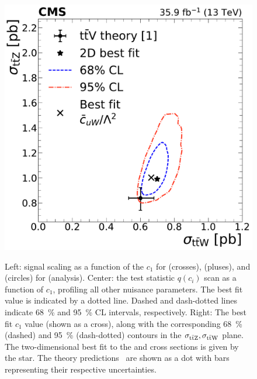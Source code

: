 \begin{landscape}
\begin{figure}
{        \includegraphics[height=\textheight]{figures/thirteen-TeV/NP/2D/ttZ_ttW_2D_1D_cuW}
      }
    \setlength{\capwidth}{14cm}
    \caption[Profile likelihood, $\mu(c_1)$, and best fit $c_1$ for \cuW (\thirteenTeV)]{Left: signal scaling as a function of the $c_1$ for \ttW (crosses), \ttZ (pluses), and \ttH (circles) for \cuW (\thirteenTeV analysis). Center: the test statistic $q(c_i)$ scan as a function of $c_1$, profiling all other nuisance parameters. The best fit value is indicated by a dotted line. Dashed and dash-dotted lines indicate \SI{68}{\percent} and \SI{95}{\percent} CL intervals, respectively. Right: The best fit $c_1$ value (shown as a cross), along with the corresponding \SI{68}{\percent} (dashed) and \SI{95}{\percent} (dash-dotted) contours in the $\sigma_{\text{t}\bar{\text{t}}\text{Z}}, \sigma_{\text{t}\bar{\text{t}}\text{W}}$ plane. The two-dimensional best fit to the \ttW and \ttZ cross sections is given by the star. The theory predictions~\cite{deFlorian:2016spz} are shown as a dot with bars representing their respective uncertainties.}%
    \label{fig:results-cuW}
  \end{figure}
  \begin{figure}
      \resizebox{!}{7.2cm}{
}
\end{figure}
\end{landscape}
